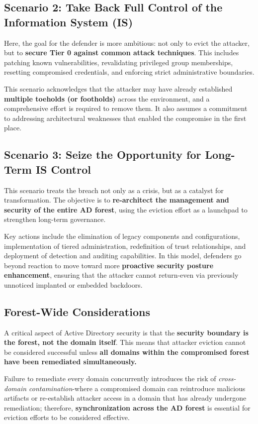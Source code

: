 \subsection{Scenario 2: Take Back Full Control of the Information System (IS)}
Here, the goal for the defender is more ambitious: not only to evict the attacker, but to \textbf{secure Tier 0 against common attack techniques}. This includes patching known vulnerabilities, revalidating privileged group memberships, resetting compromised credentials, and enforcing strict administrative boundaries.

This scenario acknowledges that the attacker may have already established \textbf{multiple toeholds (or footholds)} across the environment, and a comprehensive effort is required to remove them. It also assumes a commitment to addressing architectural weaknesses that enabled the compromise in the first place.

\subsection{Scenario 3: Seize the Opportunity for Long-Term IS Control}
This scenario treats the breach not only as a crisis, but as a catalyst for transformation. The objective is to \textbf{re-architect the management and security of the entire AD forest}, using the eviction effort as a launchpad to strengthen long-term governance.

Key actions include the elimination of legacy components and configurations, implementation of tiered administration, redefinition of trust relationships, and deployment of detection and auditing capabilities. In this model, defenders go beyond reaction to move toward more \textbf{proactive security posture enhancement}, ensuring that the attacker cannot return-even via previously unnoticed implanted or embedded backdoors.

\subsection{Forest-Wide Considerations}
A critical aspect of Active Directory security is that the \textbf{security boundary is the forest, not the domain itself}. This means that attacker eviction cannot be considered successful unless \textbf{all domains within the compromised forest have been remediated simultaneously.}

Failure to remediate every domain concurrently introduces the risk of \textit{cross-domain contamination}-where a compromised domain can reintroduce malicious artifacts or re-establish attacker access in a domain that has already undergone remediation; therefore, \textbf{synchronization across the AD forest} is essential for eviction efforts to be considered effective.

